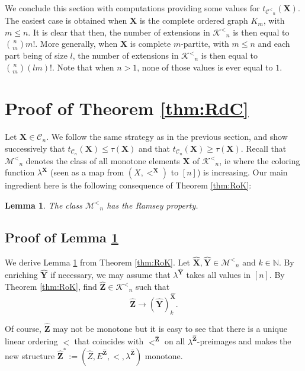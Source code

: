\documentclass[reqno]{amsart}
\newtheorem{lemma}{Lemma}
\begin{document}
We conclude this section with computations providing some values for $t_{{\mathcal{C}^<} _n}({\textbf{{X}}})$. The easiest case is obtained when ${\textbf{{X}}}$ is the complete ordered graph $K_m$, with $m\leq n$. It is clear that then, the number of extensions in ${\mathcal{K}^<} _n$ is then equal to $\binom{n}{m} m!$. More generally, when ${\textbf{{X}}}$ is complete $m$-partite, with $m\leq n$ and each part being of size $l$, the number of extensions in ${\mathcal{K}^<} _n$ is then equal to $\binom{n}{m} (lm)!$. Note that when $n>1$, none of those values is ever equal to $1$.   

\section{Proof of Theorem \ref{thm:RdC}}

\label{section:RdC}

Let ${\textbf{{X}}} \in {\mathcal{C}} _n$. We follow the same strategy as in the previous section, and show successively that $t_{{\mathcal{C}} _n}({\textbf{{X}}}) \leq \tau({\textbf{{X}}})$ and that $t_{{\mathcal{C}} _n}({\textbf{{X}}}) \geq \tau({\textbf{{X}}})$. Recall that ${\mathcal{M}^<} _n$ denotes the class of all monotone elements ${\textbf{{X}}}$ of ${\mathcal{K}^<} _n$, ie where the coloring function $\lambda^{{\textbf{{X}}}}$ (seen as a map from $(X,<^{{\textbf{{X}}}})$ to $[n]$) is increasing. Our main ingredient here is the following consequence of Theorem \ref{thm:RoK}:  

\begin{lemma}
\label{thm:RoM}
The class ${\mathcal{M}^<} _n$ has the Ramsey property.
\end{lemma}

\subsection{Proof of Lemma \ref{thm:RoM}}

We derive Lemma \ref{thm:RoM} from Theorem \ref{thm:RoK}. Let ${\widehat{\textbf{{X}}}}, {\widehat{\textbf{{Y}}}} \in {\mathcal{M}^<} _n$ and $k \in {\mathbb{N}}$. By enriching ${\widehat{\textbf{{Y}}}}$ if necessary, we may assume that $\lambda^{{\widehat{\textbf{{Y}}}}}$ takes all values in $[n]$. By Theorem \ref{thm:RoK}, find ${\widehat{\textbf{{Z}}}} \in {\mathcal{K}^<} _n$ such that \[ {\widehat{\textbf{{Z}}}} {\longrightarrow {{({\widehat{\textbf{{Y}}}})}}^{{{\widehat{\textbf{{X}}}}}}_{{k}}}.\] 

Of course, ${\widehat{\textbf{{Z}}}}$ may not be monotone but it is easy to see that there is a unique linear ordering $<$ that coincides with $<^{{\widehat{\textbf{{Z}}}}}$ on all $\lambda^{{\widehat{\textbf{{Z}}}}}$-preimages and makes the new structure ${\widehat{\textbf{{Z}}}} ^* := (\hat{Z}, E^{{\widehat{\textbf{{Z}}}}}, <, \lambda^{{\widehat{\textbf{{Z}}}}})$ monotone. 
\end{document}

